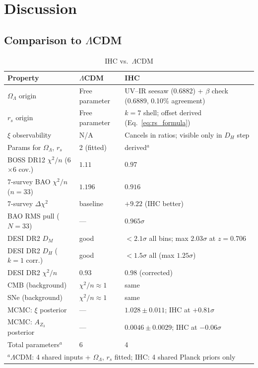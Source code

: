 \documentclass[12pt,a4paper]{article}
\begin{document}
\section{Discussion}

\subsection{Comparison to $\Lambda$CDM}

\begin{table}[htbp]
\centering
\caption{IHC vs.\ $\Lambda$CDM}
\label{tab:comparison}
\begin{tabular}{lp{}p{}}
\toprule
Property & $\Lambda$CDM & IHC \\
\midrule
$\Omega_\Lambda$ origin & Free parameter & UV--IR seesaw (0.6882) + $\beta$ check (0.6889, 0.10\% agreement) \\
$r_s$ origin & Free parameter & $k=7$ shell; offset derived (Eq.~\ref{eq:rs_formula}) \\
$\xi$ observability & N/A & Cancels in ratios; visible only in $D_H$ step \\
Params for $\Omega_\Lambda$, $r_s$ & 2 (fitted) & derived$^a$ \\
BOSS DR12 $\chi^2/n$ (6$\times$6 cov.) & $1.11$ & $0.97$ \\
7-survey BAO $\chi^2/n$ ($n=33$) & $1.196$ & $0.916$ \\
7-survey $\Delta\chi^2$ & baseline & $+9.22$ (IHC better) \\
BAO RMS pull ($N=33$) & --- & $0.965\sigma$ \\
DESI DR2 $D_M$ & good & $<2.1\sigma$ all bins; max $2.03\sigma$ at $z=0.706$ \\
DESI DR2 $D_H$ ($k=1$ corr.) & good & $< 1.5\sigma$ all (max $1.25\sigma$) \\
DESI DR2 $\chi^2/n$ & $0.93$ & $0.98$ (corrected) \\
CMB (background) & $\chi^2/n \approx 1$ & same \\
SNe (background) & $\chi^2/n \approx 1$ & same \\
MCMC: $\xi$ posterior & --- & $1.028 \pm 0.011$; IHC at $+0.81\sigma$ \\
MCMC: $A_{Z_3}$ posterior & --- & $0.0046 \pm 0.0029$; IHC at $-0.06\sigma$ \\
Total parameters$^a$ & 6 & 4 \\
\bottomrule
\multicolumn{3}{l}{\small $^a$$\Lambda$CDM: 4 shared inputs + $\Omega_\Lambda$, $r_s$ fitted; IHC: 4 shared Planck priors only}
\end{tabular}
\end{table}
\end{document}
